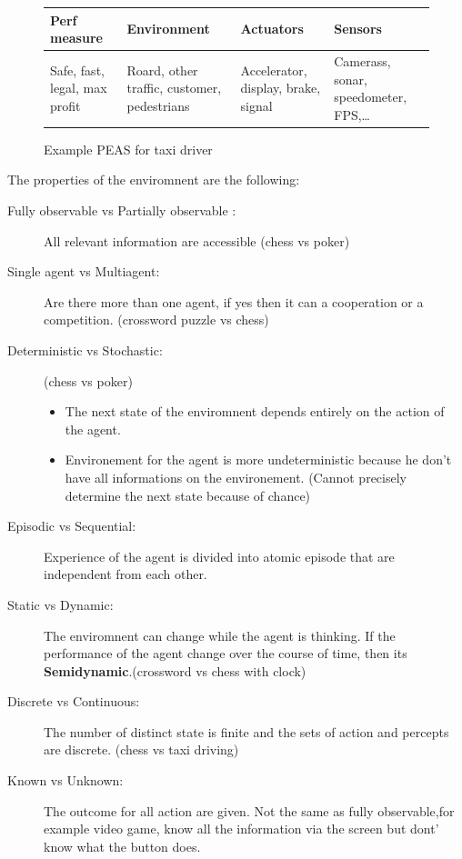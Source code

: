 \begin{figure}[h]
    \centering
    \begin{tabular}{|m{3cm}|m{3cm}|m{3cm}|m{3cm}|}
        \hline
        Perf measure & Environment & Actuators & Sensors \\
        \hline
        Safe, fast, legal, max profit  & Roard, other traffic, customer,
        pedestrians &  Accelerator, display,  brake, signal  & Camerass,
        sonar, speedometer, FPS,\ldots \\
        \hline

    \end{tabular}
    \caption{Example PEAS for taxi driver}
\end{figure}

The properties of the enviromnent are the following:
\begin{description}
\item[Fully observable vs Partially observable :] All relevant information are accessible (chess vs poker)
\item[Single agent vs Multiagent:] Are there more than one agent, if yes then it can a cooperation or a 
competition. (crossword puzzle vs chess)
\item[Deterministic vs Stochastic:] (chess vs poker)
    \begin{itemize}
        \item The next state of the enviromnent depends entirely on the action of the 
agent. 
        \item Environement for the agent is more undeterministic because 
            he don't have all informations on the environement. (Cannot precisely
            determine the next state because of chance)
    \end{itemize}
\item[Episodic vs Sequential:] Experience of the agent is divided into atomic episode that are independent 
from each other.
\item[Static vs Dynamic:] The enviromnent can change while the agent is thinking. If the performance of the 
agent change over the course of time, then its \textbf{Semidynamic}.(crossword vs chess with clock)
\item[Discrete vs Continuous:] The number of distinct state is finite and the sets of action and percepts are 
discrete. (chess vs taxi driving)
\item[Known vs Unknown:]  The outcome for all action are given. Not the same as fully observable,for 
example video game, know all the information via the screen but dont' know what the button does.

\end{description}

